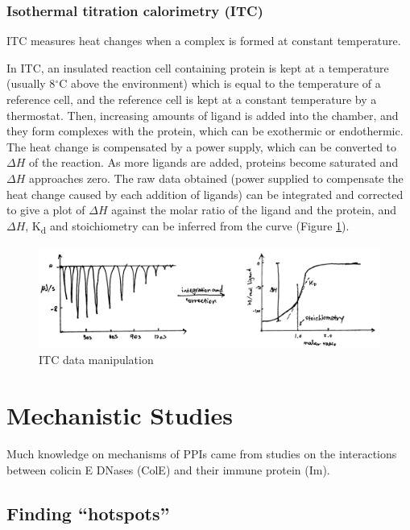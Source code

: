 \documentclass[
]{article}
\begin{document}
\hypertarget{isothermal-titration-calorimetry-itc}{%
\subsubsection{Isothermal titration calorimetry (ITC)}\label{isothermal-titration-calorimetry-itc}}

ITC measures heat changes when a complex is formed at constant temperature.

In ITC, an insulated reaction cell containing protein is kept at a temperature (usually 8\(^\circ\text{C}\) above the environment) which is equal to the temperature of a reference cell, and the reference cell is kept at a constant temperature by a thermostat. Then, increasing amounts of ligand is added into the chamber, and they form complexes with the protein, which can be exothermic or endothermic. The heat change is compensated by a power supply, which can be converted to \(\Delta H\) of the reaction. As more ligands are added, proteins become saturated and \(\Delta H\) approaches zero. The raw data obtained (power supplied to compensate the heat change caused by each addition of ligands) can be integrated and corrected to give a plot of \(\Delta H\) against the molar ratio of the ligand and the protein, and \(\Delta H\), K\textsubscript{d} and stoichiometry can be inferred from the curve (Figure \ref{fig:itc}).

\begin{figure}
\includegraphics[width=1\linewidth]{../img/itc} \caption{ITC data manipulation}\label{fig:itc}
\end{figure}

\hypertarget{mechanistic-studies}{%
\section{Mechanistic Studies}\label{mechanistic-studies}}

Much knowledge on mechanisms of PPIs came from studies on the interactions between colicin E DNases (ColE) and their immune protein (Im).

\hypertarget{finding-hotspots}{%
\subsection{Finding ``hotspots''}\label{finding-hotspots}}
\end{document}
